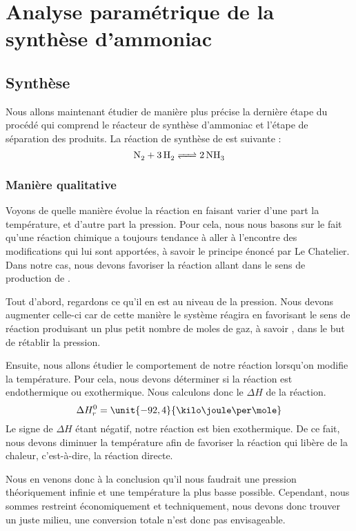 \chapter{Analyse paramétrique de la synthèse d'ammoniac}
\section{Synthèse }%

Nous allons maintenant étudier de manière plus précise la dernière étape du procédé qui comprend le réacteur de synthèse d’ammoniac et l'étape de séparation des produits.
La réaction de synthèse de  est suivante :
\[ \ce{N_2 + 3H2 <=> 2NH3} \]

\subsection{Manière qualitative}

Voyons de quelle manière évolue la réaction en faisant varier d'une part la température, et d'autre part la pression. Pour cela, nous nous basons sur le fait qu'une réaction chimique a toujours tendance à   aller à l'encontre des modifications qui lui sont apportées, à savoir le principe énoncé par Le Chatelier. Dans notre cas, nous devons favoriser la réaction allant dans le sens de production de .

Tout d'abord, regardons ce qu'il en est au niveau de la pression. Nous devons augmenter celle-ci car de cette manière le système réagira en favorisant le sens de réaction produisant un plus petit nombre de moles de gaz, à savoir , dans le but de rétablir la pression. 

Ensuite, nous allons étudier le comportement de notre réaction lorsqu'on modifie la température. Pour cela, nous devons déterminer si la réaction est endothermique ou exothermique. Nous calculons donc le $\Delta H$  de la réaction.
\[ \Delta H^0_r = \unit{-92,4}{\kilo\joule\per\mole} \]
Le signe de $\Delta H$ étant négatif, notre réaction est bien exothermique. De ce fait, nous devons diminuer la température afin de favoriser la réaction qui libère de la chaleur, c'est-à-dire, la réaction directe.

Nous en venons donc à la conclusion qu'il nous faudrait une pression théoriquement infinie et une température la plus basse possible. Cependant, nous sommes restreint économiquement et techniquement, nous devons donc trouver un juste milieu, une conversion totale n'est donc pas envisageable. 
\\

